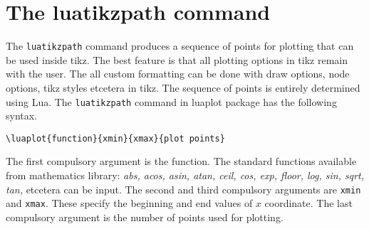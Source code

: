 \documentclass{article}
\begin{document}
\section{The luatikzpath command}
The \verb|luatikzpath| command produces a sequence of points for plotting that can be used inside tikz. The best feature is that all plotting options in tikz remain with the user. The all custom formatting can be done with draw options, node options, tikz styles etcetera in tikz. The sequence of points is entirely determined using Lua. The  \verb|luatikzpath| command in luaplot package has the following syntax.
\begin{center}
\begin{lstlisting}[caption={[]}]
\luaplot{function}{xmin}{xmax}{plot points}
\end{lstlisting}
\end{center}
The first compulsory argument is the function.  The standard functions available from mathematics library: \emph{abs, acos, asin, atan, ceil, cos, exp, floor, log, sin, sqrt, tan,}  etcetera can be input. The second and third compulsory arguments are \verb|xmin| and \verb|xmax|. These specify the beginning and end values of \(x\) coordinate. The last compulsory argument is the number of points used for plotting. 
\end{document}
